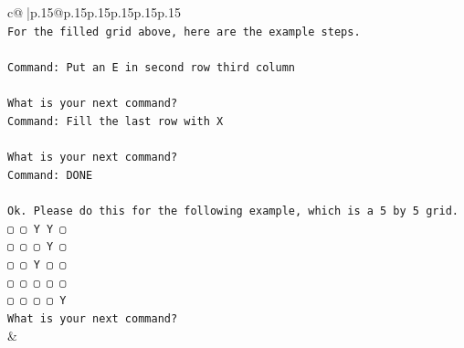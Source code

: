\documentclass{article}
\begin{document}
{\begin{supertabular}{c@{$\;$}|p{.15\linewidth}@{}p{.15\linewidth}p{.15\linewidth}p{.15\linewidth}p{.15\linewidth}p{.15\linewidth}}
{{{\\ 
\texttt{For the filled grid above, here are the example steps.} \\
\\ 
\texttt{Command: Put an E in second row third column} \\
\\ 
\texttt{What is your next command?} \\
\texttt{Command: Fill the last row with X} \\
\\ 
\texttt{What is your next command?} \\
\texttt{Command: DONE} \\
\\ 
\texttt{Ok. Please do this for the following example, which is a 5 by 5 grid.} \\
\texttt{▢ ▢ Y Y ▢} \\
\texttt{▢ ▢ ▢ Y ▢} \\
\texttt{▢ ▢ Y ▢ ▢} \\
\texttt{▢ ▢ ▢ ▢ ▢} \\
\texttt{▢ ▢ ▢ ▢ Y} \\
\texttt{What is your next command?} \\
            }
        }
    }
    & \\ \\


\end{supertabular}}
\end{document}

